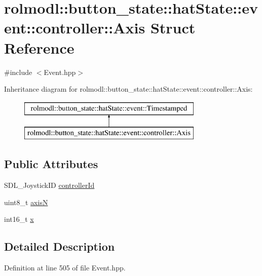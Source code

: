 \hypertarget{structrolmodl_1_1button__state_1_1hat_state_1_1event_1_1controller_1_1_axis}{}\section{rolmodl\+::button\+\_\+state\+::hat\+State\+::event\+::controller\+::Axis Struct Reference}
\label{structrolmodl_1_1button__state_1_1hat_state_1_1event_1_1controller_1_1_axis}


{\ttfamily \#include $<$Event.\+hpp$>$}

Inheritance diagram for rolmodl\+::button\+\_\+state\+::hat\+State\+::event\+::controller\+::Axis\+:\begin{figure}[H]
\begin{center}
\leavevmode
\includegraphics[height=2.000000cm]{structrolmodl_1_1button__state_1_1hat_state_1_1event_1_1controller_1_1_axis}
\end{center}
\end{figure}
\subsection*{Public Attributes}
\begin{DoxyCompactItemize}
\item 
S\+D\+L\+\_\+\+Joystick\+ID \mbox{\hyperlink{structrolmodl_1_1button__state_1_1hat_state_1_1event_1_1controller_1_1_axis_ac6e8d9c84c6d37996aff756d4832c1fe}{controller\+Id}}
\item 
uint8\+\_\+t \mbox{\hyperlink{structrolmodl_1_1button__state_1_1hat_state_1_1event_1_1controller_1_1_axis_a5bd1e512e61cdd8e8c85bb68dcc5fb0c}{axisN}}
\item 
int16\+\_\+t \mbox{\hyperlink{structrolmodl_1_1button__state_1_1hat_state_1_1event_1_1controller_1_1_axis_a8a91acda23f61aa263cf1d65608e4e09}{x}}
\end{DoxyCompactItemize}


\subsection{Detailed Description}


Definition at line 505 of file Event.\+hpp.



